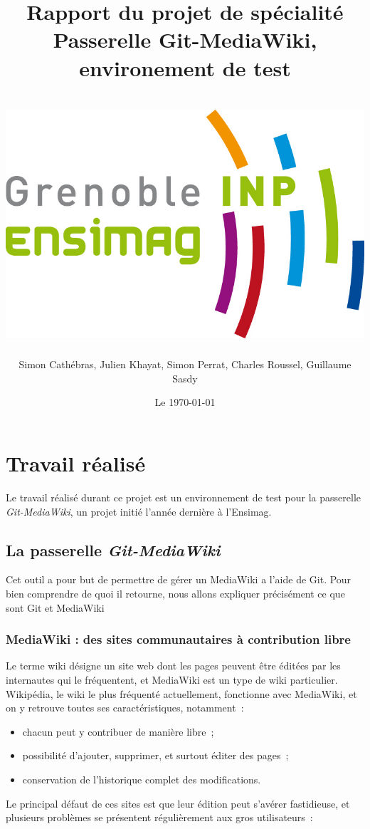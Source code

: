 \documentclass[11pt]{article}
\title{Rapport du projet de spécialité\\
  Passerelle Git-MediaWiki, environement de test\\
  ~\\
  \includegraphics[scale=0.75]{logo_ensimag.jpg} 
}
\author{Simon Cathébras, Julien Khayat, Simon Perrat, Charles Roussel,
  Guillaume Sasdy}
\date{Le \today}
\begin{document}
\maketitle

\section{Travail réalisé}

Le travail réalisé durant ce projet est un environnement de test pour
la passerelle \textit{Git-MediaWiki}, un projet initié l'année
dernière à l'Ensimag.

\subsection{La passerelle  \textit{Git-MediaWiki}}

Cet outil a pour but de permettre de gérer un MediaWiki a l'aide de
Git. Pour bien comprendre de quoi il retourne, nous allons expliquer
précisément ce que sont Git et MediaWiki

\subsubsection{MediaWiki : des sites communautaires à contribution libre}

Le terme wiki désigne un site web dont les pages peuvent être éditées
par les internautes qui le fréquentent, et MediaWiki est un type de
wiki particulier. Wikipédia, le wiki le plus fréquenté actuellement,
fonctionne avec MediaWiki, et on y retrouve toutes ses
caractéristiques, notamment~:


\begin{itemize}
\item chacun peut y contribuer de manière libre~;
\item possibilité d'ajouter, supprimer, et surtout éditer des pages~;
\item conservation de l'historique complet des modifications.
\end{itemize}

Le principal défaut de ces sites est que leur édition peut s'avérer
fastidieuse, et plusieurs problèmes se présentent régulièrement aux
gros utilisateurs~:
\end{document}
